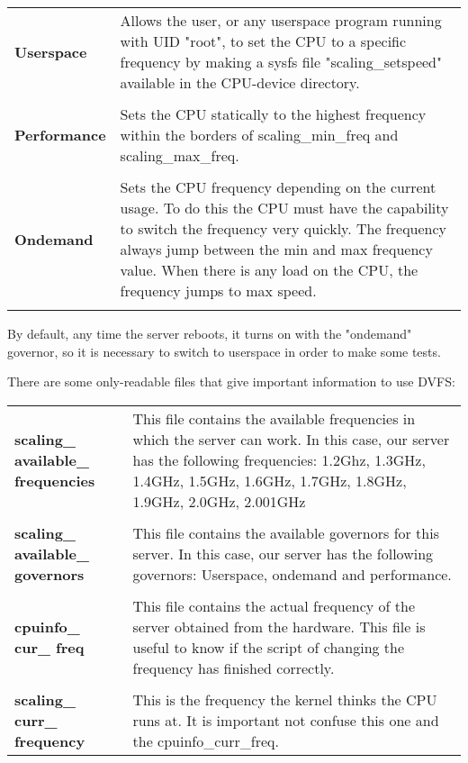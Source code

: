 \begin{tabular}{ p{2.3cm} p{10.2cm}}
  \bf Userspace & Allows the user, or any userspace program running with UID "root", to set the CPU to a specific frequency by making a sysfs file "scaling\_setspeed" available in the CPU-device
directory. \\ \\
  \bf Performance & Sets the CPU statically to the highest frequency within the borders of scaling\_min\_freq and scaling\_max\_freq. \\ \\
  \bf Ondemand & Sets the CPU frequency depending on the current usage. To do this the CPU must have the capability to switch the frequency very quickly. The frequency always jump between the min and max frequency value. When there is any load on the CPU, the frequency jumps to max speed.\\ \\
\end{tabular}

By default, any time the server reboots, it turns on with the "ondemand" governor, so it is necessary to switch to userspace in order to make some tests.

There are some only-readable files that give important information to use DVFS:

\begin{tabular}{ p{2.3cm} p{10.2cm}}
  \bf scaling\_ available\_ frequencies & This file contains the available frequencies in which the server can work. In this case, our server has the following frequencies: 1.2Ghz, 1.3GHz, 1.4GHz, 1.5GHz, 1.6GHz, 1.7GHz, 1.8GHz, 1.9GHz, 2.0GHz, 2.001GHz \\ \\
  \bf scaling\_ available\_ governors &  This file contains the available governors for this server. In this case, our server has the following governors: Userspace, ondemand and performance. \\ \\
    \bf cpuinfo\_ cur\_ freq &  This file contains the actual frequency of the server obtained from the hardware. This file is useful to know if the script of changing the frequency has finished correctly.  \\ \\
  \bf scaling\_ curr\_ frequency &  This is	the frequency the kernel thinks the CPU runs at. It is important not confuse  this one and the cpuinfo\_curr\_freq. \\
\end{tabular}

